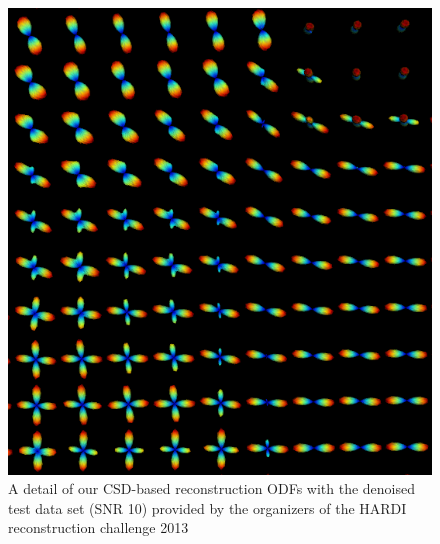 \documentclass[9pt,conference,a4paper]{IEEEtran}
\begin{document}
\begin{figure}[h]
\begin{centering}
\includegraphics{csd_test_snr10}
\end{centering}
\caption{A detail of our CSD-based reconstruction ODFs with the denoised test data set (SNR 10) provided by the organizers of the HARDI reconstruction challenge 2013}
\end{figure}
\end{document}
